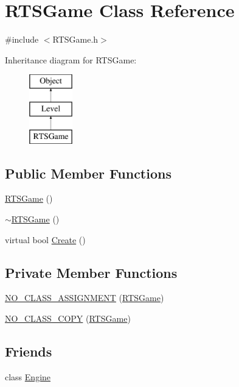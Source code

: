 \section{R\-T\-S\-Game Class Reference}
\label{class_r_t_s_game}


{\ttfamily \#include $<$R\-T\-S\-Game.\-h$>$}

Inheritance diagram for R\-T\-S\-Game\-:\begin{figure}[H]
\begin{center}
\leavevmode
\includegraphics[height=3.000000cm]{class_r_t_s_game}
\end{center}
\end{figure}
\subsection*{Public Member Functions}
\begin{DoxyCompactItemize}
\item 
\hyperlink{class_r_t_s_game_af98e3a818138027f8f3ced2de0c3e831}{R\-T\-S\-Game} ()
\item 
\hyperlink{class_r_t_s_game_a638131a6a852287b04f50dfa489281f1}{$\sim$\-R\-T\-S\-Game} ()
\item 
virtual bool \hyperlink{class_r_t_s_game_afa4ab03c7a6805221e4ead02ab39a503}{Create} ()
\end{DoxyCompactItemize}
\subsection*{Private Member Functions}
\begin{DoxyCompactItemize}
\item 
\hyperlink{class_r_t_s_game_a0e12d1ea6ec0b5e0909d3426904771b7}{N\-O\-\_\-\-C\-L\-A\-S\-S\-\_\-\-A\-S\-S\-I\-G\-N\-M\-E\-N\-T} (\hyperlink{class_r_t_s_game}{R\-T\-S\-Game})
\item 
\hyperlink{class_r_t_s_game_a16913137600f1857a914ab3b3a6301fd}{N\-O\-\_\-\-C\-L\-A\-S\-S\-\_\-\-C\-O\-P\-Y} (\hyperlink{class_r_t_s_game}{R\-T\-S\-Game})
\end{DoxyCompactItemize}
\subsection*{Friends}
\begin{DoxyCompactItemize}
\item 
class \hyperlink{class_r_t_s_game_a3e1914489e4bed4f9f23cdeab34a43dc}{Engine}
\end{DoxyCompactItemize}


